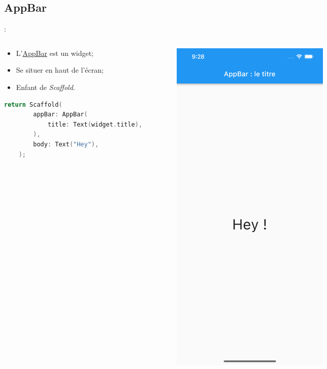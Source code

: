 \documentclass[10pt]{beamer}
\begin{document}
\subsection{AppBar}
\begin{frame}[fragile,t]{\secname : \subsecname}
    \begin{columns}
        \begin{column}{0.5\textwidth}
            \begin{itemize}
                \item L'\href{https://api.flutter.dev/flutter/material/AppBar-class.html}{AppBar} est un widget;
                \item Se situer en haut de l’écran;
                \item Enfant de \emph{Scaffold}.
            \end{itemize}
            \begin{lstlisting}[language=C]
    return Scaffold(
        appBar: AppBar(
            title: Text(widget.title),
        ),
        body: Text("Hey"),
    );
    \end{lstlisting}
        \end{column}
        \begin{column}{0.5\textwidth}
            \begin{figure}
                \begin{center}
                    \includegraphics[width=0.60\textwidth]{../assets/img/AppBar.jpg}
                \end{center}
            \end{figure}\end{column}
    \end{columns}
\end{frame}
\end{document}
